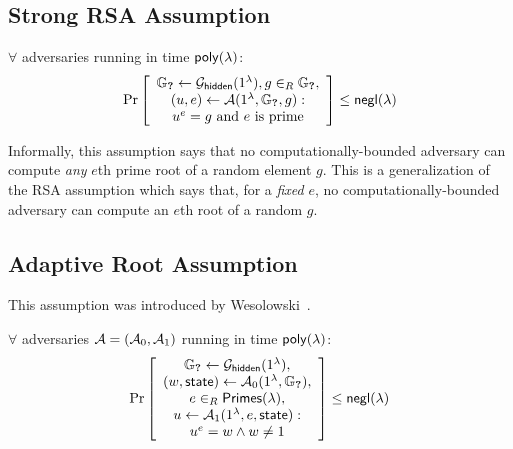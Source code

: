 \subsection{Strong RSA Assumption}
\label{s:prelim:strong-rsa}

\begin{definition}
\label{def:strong-rsa}
$\forall$ adversaries \Adv running in time $\mathsf{poly}(\lambda)$:
\begin{align*}
    \Pr \left[\begin{array}{c}
        \mathbb{G}_{\textbf{?}} \leftarrow \mathcal{G}_{\mathsf{hidden}}(1^\lambda), g \in_R \mathbb{G}_{\textbf{?}},\\
        (u, e) \leftarrow \mathcal{A}(1^\lambda, \mathbb{G}_{\textbf{?}}, g):\\
        u^e = g\ \text{and}\ e\ \text{is prime}
    \end{array}
    \right] \le \mathsf{negl}(\lambda)
\end{align*}
\end{definition}

Informally, this assumption says that no computationally-bounded adversary can compute \textit{any} $e$th prime root of a random element $g$.
This is a generalization of the RSA assumption which says that, for a \textit{fixed} $e$, no computationally-bounded adversary can compute an $e$th root of a random $g$.

\subsection{Adaptive Root Assumption}
\label{s:prelim:adaptive-root-assumption}

This assumption was introduced by Wesolowski~\cite{Wesolowski19}.

\begin{definition}
\label{def:adaptive-root}
$\forall$ adversaries $\mathcal{A}=(\mathcal{A}_0,\mathcal{A}_1)$ running in time $\mathsf{poly}(\lambda)$:
\begin{align*}
    \Pr \left[\begin{array}{c}
        \mathbb{G}_{\textbf{?}} \leftarrow \mathcal{G}_{\mathsf{hidden}}(1^\lambda),\\
        (w, \mathsf{state}) \leftarrow \mathcal{A}_0(1^\lambda, \mathbb{G}_{\textbf{?}}),\\
        e \in_R \mathsf{Primes}(\lambda),\\
        u \leftarrow \mathcal{A}_1(1^\lambda, e, \mathsf{state}):\\
        {u^e = w} \wedge {w\ne 1}
    \end{array}
    \right] \le \mathsf{negl}(\lambda)
\end{align*}
\end{definition}

